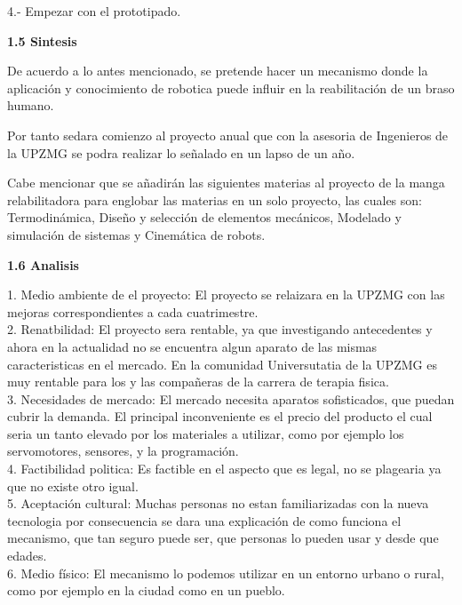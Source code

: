 \documentclass[12pt,letterpaper]{report}
\begin{document}
\begin{flushleft}
\begin{flushleft}
\begin{flushleft}
\begin{flushleft}
\begin{flushleft}
\begin{flushleft}
\begin{flushleft}
\begin{flushleft}
\begin{flushleft}
\begin{flushleft}
\begin{flushleft}
\begin{flushleft}
\begin{flushleft}
\begin{flushleft}
4.- Empezar con el prototipado.
\begin{flushleft}
\textbf{1.5 Sintesis}
\begin{flushleft}
De acuerdo a lo antes mencionado, se pretende hacer un mecanismo donde la aplicación y conocimiento de robotica puede influir en la reabilitación de un braso humano.
\end{flushleft}
\begin{flushleft}
Por tanto sedara comienzo al proyecto anual que con la asesoria de Ingenieros de la UPZMG se podra realizar lo señalado en un lapso de un año.
\begin{flushleft}
Cabe mencionar que se añadirán las siguientes materias al proyecto de la manga relabilitadora para englobar las materias en un solo proyecto, las cuales son: Termodinámica, Diseño y selección de elementos mecánicos, Modelado y simulación de sistemas y Cinemática de robots.
\begin{flushleft}
\textbf{1.6 Analisis}
\begin{flushleft}
1.	Medio ambiente de el proyecto:
El proyecto se relaizara en la UPZMG con las mejoras correspondientes a cada cuatrimestre.\\

2.	Renatbilidad:
El proyecto sera rentable, ya que investigando antecedentes y ahora en la actualidad no se encuentra algun aparato de las mismas caracteristicas en el mercado.
En la comunidad Universutatia de la UPZMG es muy rentable para los y las compañeras de la carrera de terapia fisica.\\

3.	Necesidades de mercado:
El mercado necesita aparatos sofisticados, que puedan cubrir la demanda. El principal inconveniente es el precio del producto el cual seria un tanto elevado por los materiales a utilizar, como por ejemplo los servomotores, sensores, y la programación.\\

4.	Factibilidad politica:
Es factible en el aspecto que es legal, no se plagearia ya que no existe otro igual.\\

5.	Aceptación cultural:
Muchas personas no estan familiarizadas con la nueva tecnologia por consecuencia se dara una explicación de como funciona el mecanismo, que tan seguro puede ser,  que personas lo pueden usar y desde  que edades.\\

6.	Medio físico:
El mecanismo lo podemos utilizar en un entorno urbano o rural, como por ejemplo en la ciudad como en un pueblo.\begin{flushleft}


\end{flushleft}
\end{flushleft}
\end{flushleft}
\end{flushleft}
\end{flushleft}
\end{flushleft}
\end{flushleft}
\end{flushleft}
\end{flushleft}
\end{flushleft}
\end{flushleft}
\end{flushleft}
\end{flushleft}
\end{flushleft}
\end{flushleft}
\end{flushleft}
\end{flushleft}
\end{flushleft}
\end{flushleft}
\end{flushleft}
\end{document}
